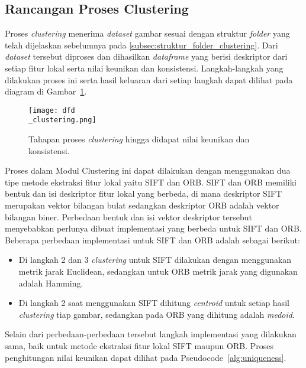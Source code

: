 \subsection{Rancangan Proses Clustering}
\label{subsec:rancangan_proses_clustering}
Proses \textit{clustering} menerima \textit{dataset} gambar sesuai dengan struktur \textit{folder} yang telah dijelaskan sebelumnya pada \ref{subsec:struktur_folder_clustering}. Dari \textit{dataset} tersebut diproses dan dihasilkan \textit{dataframe} yang berisi deskriptor dari setiap fitur lokal serta nilai keunikan dan konsistensi. Langkah-langkah yang dilakukan proses ini serta hasil keluaran dari setiap langkah dapat dilihat pada diagram di Gambar~\ref{fig:dfd_clustering}.
\begin{figure}[H]
	\centering
	\texttt{[image: dfd\\\_clustering.png]}
	\caption{Tahapan proses \textit{clustering} hingga didapat nilai keunikan dan konsistensi.}
	\label{fig:dfd_clustering}
\end{figure}
Proses dalam Modul Clustering ini dapat dilakukan dengan menggunakan dua tipe metode ekstraksi fitur lokal yaitu SIFT dan ORB. SIFT dan ORB memiliki bentuk dan isi deskriptor fitur lokal yang berbeda, di mana deskriptor SIFT merupakan vektor bilangan bulat sedangkan deskriptor ORB adalah vektor bilangan biner. Perbedaan bentuk dan isi vektor deskriptor tersebut menyebabkan perlunya dibuat implementasi yang berbeda untuk SIFT dan ORB. Beberapa perbedaan implementasi untuk SIFT dan ORB adalah sebagai berikut:
\begin{itemize}
	\item Di langkah 2 dan 3 \textit{clustering} untuk SIFT dilakukan dengan menggunakan metrik jarak Euclidean, sedangkan untuk ORB metrik jarak yang digunakan adalah Hamming.
	\item Di langkah 2 saat menggunakan SIFT dihitung \textit{centroid} untuk setiap hasil \textit{clustering} tiap gambar, sedangkan pada ORB yang dihitung adalah \textit{medoid}.
\end{itemize}
Selain dari perbedaan-perbedaan tersebut langkah implementasi yang dilakukan sama, baik untuk metode ekstraksi fitur lokal SIFT maupun ORB. Proses penghitungan nilai keunikan dapat dilihat pada Pseudocode~\ref{alg:uniqueness}. \\


